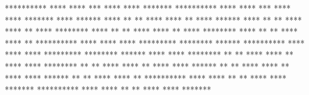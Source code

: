   **********      ****        ****       ***       ****        ****    *******
  **********      ****        ****       ***       ****        ****    *******
****              ******      ****      ** **      ****      ****      **
****              ******      ****      ** **      ****      ****      **
****              ********    ****     **   **     ****    ****        **
****              ********    ****     **   **     ****    ****        **
  **********      ****  ****  ****    *********    ********            ******
  **********      ****  ****  ****    *********    ********            ******
          ****    ****    ********    **     **    ****    ****        **
          ****    ****    ********    **     **    ****    ****        **
          ****    ****      ******    **     **    ****      ****      **
          ****    ****      ******    **     **    ****      ****      **
  **********      ****        ****    **     **    ****        ****    *******
  **********      ****        ****    **     **    ****        ****    *******